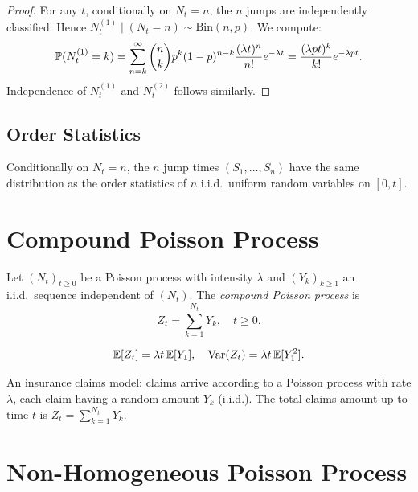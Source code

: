 \begin{proof}
For any $t$, conditionally on $N_t = n$, the $n$ jumps are independently
classified. Hence $N_t^{(1)} \mid (N_t = n) \sim \text{Bin}(n, p)$. We compute:
\[
  \mathbb{P}(N_t^{(1)} = k) = \sum_{n=k}^{\infty} \binom{n}{k} p^k (1-p)^{n-k}
  \frac{(\lambda t)^n}{n!} e^{-\lambda t} = \frac{(\lambda pt)^k}{k!} e^{-\lambda pt}.
\]
Independence of $N_t^{(1)}$ and $N_t^{(2)}$ follows similarly.
\end{proof}

\subsection{Order Statistics}

\begin{theorem}
\label{thm:order_stats}
Conditionally on $N_t = n$, the $n$ jump times $(S_1, \ldots, S_n)$ have the
same distribution as the order statistics of $n$ i.i.d.\ uniform random variables
on $[0, t]$.
\end{theorem}

\section{Compound Poisson Process}

\begin{definition}
Let $(N_t)_{t \geq 0}$ be a Poisson process with intensity $\lambda$ and
$(Y_k)_{k \geq 1}$ an i.i.d.\ sequence independent of $(N_t)$. The
\emph{compound Poisson process} is
\[
  Z_t = \sum_{k=1}^{N_t} Y_k, \quad t \geq 0.
\]
\end{definition}

\begin{proposition}
\[
  \mathbb{E}[Z_t] = \lambda t \, \mathbb{E}[Y_1], \quad \mathrm{Var}(Z_t) = \lambda t \, \mathbb{E}[Y_1^2].
\]
\end{proposition}

\begin{example}
An insurance claims model: claims arrive according to a Poisson process with
rate $\lambda$, each claim having a random amount $Y_k$ (i.i.d.). The total
claims amount up to time $t$ is $Z_t = \sum_{k=1}^{N_t} Y_k$.
\end{example}

\section{Non-Homogeneous Poisson Process}

